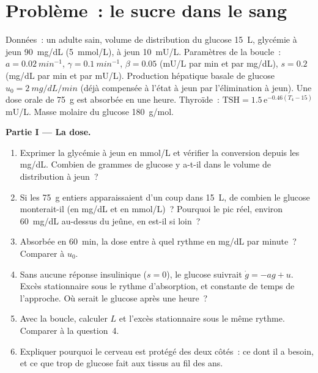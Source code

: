 \section{Problème~: le sucre dans le sang}

\begin{problem}
\label{pb:b3:endocrinology:1}
Données~: un adulte sain, volume de distribution du glucose \qty{15}{L},
glycémie à jeun \qty{90}{mg/dL} (\qty{5}{mmol/L}),  à jeun
\qty{10}{mU/L}. Paramètres de la boucle~: $a = \qty{0.02}{min^{-1}}$, $\gamma =
\qty{0.1}{min^{-1}}$, $\beta = 0.05$ (mU/L par min et par mg/dL), $s = 0.2$
(mg/dL par min et par mU/L). Production hépatique basale de glucose $u_{0} =
\qty{2}{mg/dL/min}$ (déjà compensée à l'état à jeun par l'élimination à
jeun). Une dose orale de \qty{75}{g} est absorbée en une heure.
Thyroïde~: $\text{TSH} = 1.5\,\mathrm{e}^{-0.46(T_{4} - 15)}$ mU/L. Masse
molaire du glucose \qty{180}{g/mol}.

\medskip
\noindent\textbf{Partie I --- La dose.}
\begin{enumerate}
  \item Exprimer la glycémie à jeun en mmol/L et vérifier la conversion
        depuis les mg/dL. Combien de grammes de glucose y a-t-il dans le
        volume de distribution à jeun~?
  \item Si les \qty{75}{g} entiers apparaissaient d'un coup dans
        \qty{15}{L}, de combien le glucose monterait-il (en mg/dL et en
        mmol/L)~? Pourquoi le pic réel, environ \qty{60}{mg/dL} au-dessus
        du jeûne, en est-il si loin~?
  \item Absorbée en \qty{60}{min}, la dose entre à quel rythme en mg/dL
        par minute~? Comparer à $u_{0}$.
  \item Sans aucune réponse insulinique ($s = 0$), le glucose suivrait $\dot
        g = -a g + u$. Excès stationnaire sous le rythme d'absorption, et
        constante de temps de l'approche. Où serait le glucose après une
        heure~?
  \item Avec la boucle, calculer $L$ et l'excès stationnaire sous le même
        rythme. Comparer à la question~4.
  \item Expliquer pourquoi le cerveau est protégé des deux côtés~: ce
        dont il a besoin, et ce que trop de glucose fait aux tissus au
        fil des ans.
\end{enumerate}


\end{problem}
